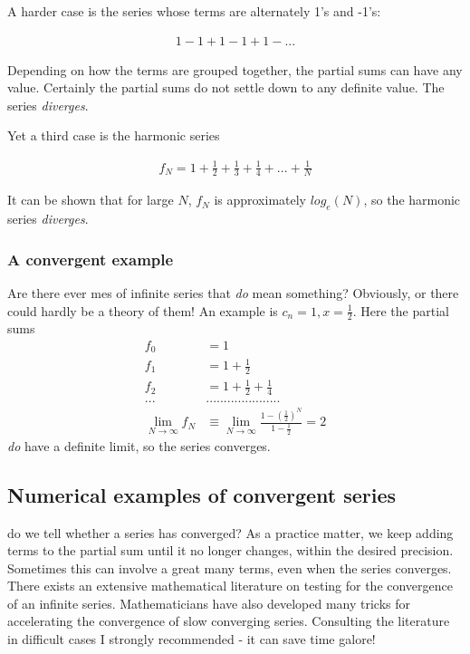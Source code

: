 A harder case is the series whose terms are alternately 1's and -1's:

\begin{align}
    1 - 1 + 1 - 1 + 1 - ...
\end{align}

Depending on how the terms are grouped together, the partial
sums can have any value. Certainly the partial sums do not settle
down to any definite value. The series \textit{diverges}.

Yet a third case is the harmonic series

\begin{align}
    f_{N} = 1 + \frac{1}{2} + \frac{1}{3} + \frac{1}{4} + ... + \frac{1}{N}
\end{align}

It can be shown that for large $N$, $f_{N}$ is approximately $log_{e}(N)$, so the harmonic series \textit{diverges}.

\subsubsection{A convergent example}
Are there ever mes of infinite series that \textit{do} mean something? Obviously, or there could hardly be a theory of them! An example is $c_{n}=1, x = \frac{1}{2}$. Here the partial sums
\begin{equation}
\begin{aligned}
f_{0} &= 1                               \\
f_{1} &= 1 + \frac{1}{2}                 \\
f_{2} &= 1 + \frac{1}{2} + \frac{1}{4}   \\
...&.....................                \\
\lim_{N\to\infty} f_{N} &\equiv \lim_{N\to\infty} \frac{1-(\frac{1}{2})^{N}}{1-\frac{1}{2}} = 2
    \label{eq:06_06}
\end{aligned}
\end{equation}
\textit{do} have a definite limit, so the series converges.

\subsection{Numerical examples of convergent series}
 do we tell whether a series has converged? As a practice matter, we keep adding terms to the partial sum until it no longer changes, within the desired precision. Sometimes this can involve a great many terms, even when the series converges. There exists an extensive mathematical literature on testing for the convergence of an infinite series. Mathematicians have also developed many tricks for accelerating the convergence of slow converging series. Consulting the literature in difficult cases I strongly recommended - it can save time galore!

